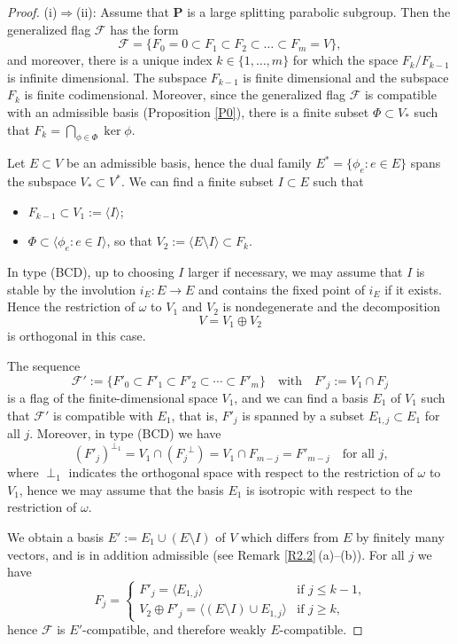 \documentclass[12pt]{amsart}
\renewcommand{\P}{\mathbf{P}}
\newcommand{\Ff}{\mathcal{F}}
\numberwithin{equation}{section}
\theoremstyle{definition}
\begin{document}
\begin{proof}
{\rm (i)}$\Rightarrow${\rm (ii)}: 
Assume that $\P$ is a large splitting parabolic subgroup. Then the generalized flag $\Ff$ has the form
\[\Ff=\{F_0=0\subset F_1\subset F_2\subset \ldots \subset F_m=V\},\]
and moreover, there is a unique index $k\in\{1,\ldots,m\}$ for which the space $F_k/F_{k-1}$ is infinite dimensional. The subspace $F_{k-1}$ is finite dimensional and the subspace $F_k$ is finite codimensional. 
Moreover, since the generalized flag $\Ff$ is compatible with an admissible basis (Proposition \ref{P0}),  there is a finite subset $\Phi\subset V_*$ such that $F_k=\bigcap_{\phi\in\Phi}\ker\phi$.

Let $E\subset V$ be an admissible basis, hence the dual family $E^*=\{\phi_e:e\in E\}$ spans the subspace $V_*\subset V^*$. We can find a finite subset $I\subset E$ such that
\begin{itemize}
\item $F_{k-1}\subset V_1:=\langle I\rangle$;
\item $\Phi\subset\langle \phi_e:e\in I\rangle$, so that $V_2:=\langle E\setminus I\rangle\subset F_k$.
\end{itemize}
In type (BCD), up to choosing $I$ larger if necessary, we may assume that $I$ is stable by the involution $i_E:E\to E$ and contains the fixed point of $i_E$ if it exists. Hence the restriction of $\omega$
to $V_1$ and $V_2$ is nondegenerate and the decomposition
\[
V=V_1\oplus V_2
\]
is orthogonal in this case.

The sequence
\[
\Ff':=\{F'_0\subset F'_1\subset F'_2\subset\cdots\subset F'_m\}\quad\mbox{with}\quad F'_j:=V_1\cap F_j
\]
is a flag of the finite-dimensional space $V_1$, and we can find a basis $E_1$ of $V_1$ such that $\Ff'$ is compatible with $E_1$, that is, $F'_j$ is spanned by a subset $E_{1,j}\subset E_1$ for all $j$. Moreover, in type (BCD) we have
\[
(F'_j)^{\perp_1}=V_1\cap ({F_j}^\perp)=V_1\cap F_{m-j}=F'_{m-j}\quad\mbox{for all $j$,}
\]
where $\perp_1$ indicates the orthogonal space with respect to the restriction of $\omega$ to $V_1$, hence we may assume that the basis $E_1$ is isotropic with respect to the restriction of $\omega$.

We obtain a basis $E':=E_1\cup(E\setminus I)$ of $V$ which differs from $E$ by finitely many vectors, and is in addition admissible (see Remark \ref{R2.2}\,{\rm (a)}--{\rm (b)}).
For all $j$ we have
\[
F_j=\left\{
\begin{array}{ll}
F'_j=\langle E_{1,j}\rangle & \mbox{if $j\leq k-1$,} \\
V_2\oplus F'_j=\langle(E\setminus I)\cup E_{1,j}\rangle & \mbox{if $j\geq k$,}
\end{array}
\right.
\]
hence $\Ff$ is $E'$-compatible, and therefore weakly $E$-compatible.



\end{proof}
\end{document}
